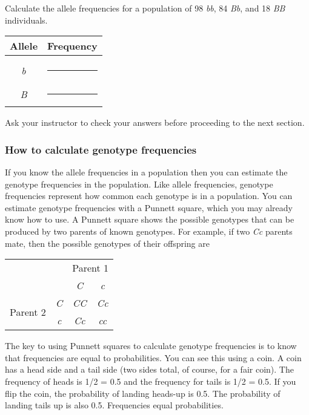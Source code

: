 \documentclass[12pt]{exam}
\newcommand{\allele}[1]{\textit{#1}}
\begin{document}
\begin{questions}

\question
Calculate the allele frequencies for a population of 98 \allele{bb}, 84 \allele{Bb}, and 18 \allele{BB} individuals.

\begin{tabular}{@{}cc@{}}
	\toprule
	Allele & Frequency\tabularnewline
	\midrule
	 & \tabularnewline
	\allele{b} & \rule{0.5in}{0.4pt}\tabularnewline[2em]
	\allele{B} & \rule{0.5in}{0.4pt}\tabularnewline
	\bottomrule 
\end{tabular}

\vspace*{\baselineskip}

Ask your instructor to check your answers before proceeding to the next section. 

\newpage

\subsubsection*{How to calculate genotype frequencies}

If you know the allele frequencies in a population then you can estimate the genotype frequencies in the population. Like allele frequencies, genotype frequencies represent how common each genotype is in a population.  You can estimate genotype frequencies with a Punnett square, which you may already know how to use.  A Punnett square shows the possible genotypes that can be produced by two parents of known genotypes. For example, if two \allele{Cc} parents mate, then the possible genotypes of their offspring are

\begin{center}
	\begin{tabular}{cc|c|c|}
		\multicolumn{2}{c}{}	& \multicolumn{2}{c}{Parent 1}\tabularnewline
		\multicolumn{2}{c}{}	& \multicolumn{1}{c}{\allele{C}}	& \multicolumn{1}{c}{\allele{c}} \tabularnewline
		\cline{3-4}
		\multirow{2}{*}{Parent 2}	& \allele{C}	& \allele{CC}	& \allele{Cc} \tabularnewline
		\cline{3-4}
				&	\allele{c} & \allele{Cc}	& \allele{cc}	\tabularnewline
		\cline{3-4}
	\end{tabular}
\end{center}

\bigskip

The key to using Punnett squares to calculate genotype frequencies is to know that frequencies are equal to probabilities. You can see this using a coin.  A coin has a head side and a tail side (two sides total, of course, for a fair coin). The frequency of heads is 1/2 = 0.5 and the frequency for tails is 1/2 = 0.5.  If you flip the coin, the probability of landing heads-up is 0.5. The probability of landing tails up is also 0.5. Frequencies equal probabilities.


\end{questions}
\end{document}
